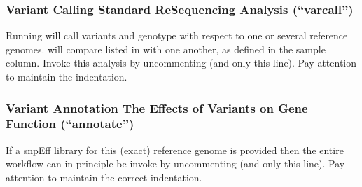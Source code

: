 \documentclass[letterpaper,10pt,english]{sphinxhowto}
\begin{document}
\begin{sphinxVerbatim}[commandchars=\\\{\}]
 
\end{sphinxVerbatim}


\subsubsection{Variant Calling \sphinxhyphen{} Standard Re\sphinxhyphen{}Sequencing Analysis (“varcall”)}
\label{\detokenize{index:id7}}
Running  will call variants and genotype  with respect to one or several reference genomes.  will compare  listed in  with one another, as defined in the sample column. Invoke this analysis by uncommenting  (and only this line). Pay attention to maintain the indentation.

\begin{sphinxVerbatim}[commandchars=\\\{\}]
 
\end{sphinxVerbatim}


\subsubsection{Variant Annotation \sphinxhyphen{} The Effects of Variants on Gene Function (“annotate”)}
\label{\detokenize{index:id8}}
If a snpEff library for this (exact) reference genome is provided then the entire workflow can in principle be invoke by uncommenting  (and only this line). Pay attention to maintain the correct indentation.
\end{document}
